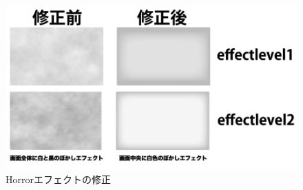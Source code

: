 \begin{figure}[H]
   \centering
   \includegraphics[width=16cm]{images/chapter3/horrorbefore.jpg}
   \caption{Horrorエフェクトの修正}
   \label{horrorbefore}
\end{figure}